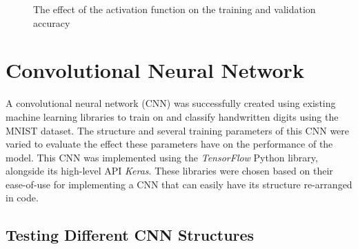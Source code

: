 \documentclass[a4paper]{article}
\begin{document}
\begin{figure} [htbp]
    \caption{The effect of the activation function on the training and validation accuracy} 
    \label{fig:mnist_ann_result_activation}
\end{figure}

\newpage

\section{Convolutional Neural Network}\label{cnn_lib}
A convolutional neural network (CNN) was successfully created using existing machine learning libraries to train on and classify handwritten digits using the MNIST dataset. The structure and several training parameters of this CNN were varied to evaluate the effect these parameters have on the performance of the model. This CNN was implemented using the \textit{TensorFlow} Python library, alongside its high-level API \textit{Keras}. These libraries were chosen based on their ease-of-use for implementing a CNN that can easily have its structure re-arranged in code. 

\subsection{Testing Different CNN Structures}
\end{document}
